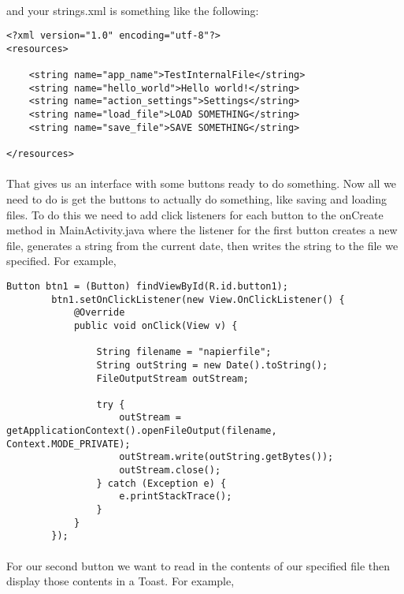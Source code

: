\paragraph{} and your strings.xml is something like the following:

\begin{lstlisting}
<?xml version="1.0" encoding="utf-8"?>
<resources>

    <string name="app_name">TestInternalFile</string>
    <string name="hello_world">Hello world!</string>
    <string name="action_settings">Settings</string>
    <string name="load_file">LOAD SOMETHING</string>
    <string name="save_file">SAVE SOMETHING</string>

</resources>
\end{lstlisting}

\paragraph{} That gives us an interface with some buttons ready to do something. Now all we need to do is get the buttons to actually do something, like saving and loading files. To do this we need to add click listeners for each button to the onCreate method in MainActivity.java where the listener for the first button creates a new file, generates a string from the current date, then writes the string to the file we specified. For example, 

\begin{lstlisting}
Button btn1 = (Button) findViewById(R.id.button1);
        btn1.setOnClickListener(new View.OnClickListener() {
            @Override
            public void onClick(View v) {

                String filename = "napierfile";
                String outString = new Date().toString();
                FileOutputStream outStream;

                try {
                    outStream = getApplicationContext().openFileOutput(filename, Context.MODE_PRIVATE);
                    outStream.write(outString.getBytes());
                    outStream.close();
                } catch (Exception e) {
                    e.printStackTrace();
                }
            }
        });
\end{lstlisting}

\paragraph{} For our second button we want to read in the contents of our specified file then display those contents in a Toast. For example,


